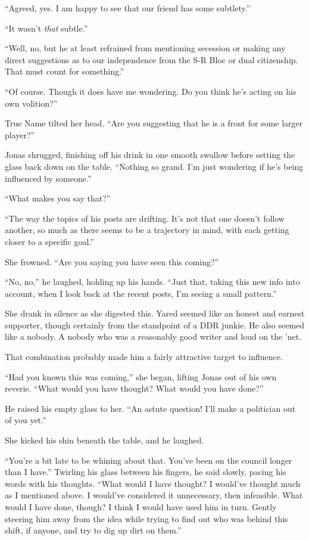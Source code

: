 ``Agreed, yes. I am happy to see that our friend has some subtlety.''

``It wasn't \emph{that} subtle.''

``Well, no, but he at least refrained from mentioning secession or making any direct suggestions as to our independence from the S-R Bloc or dual citizenship. That must count for something.''

``Of course. Though it does have me wondering. Do you think he's acting on his own volition?''

True Name tilted her head. ``Are you suggesting that he is a front for some larger player?''

Jonas shrugged, finishing off his drink in one smooth swallow before setting the glass back down on the table. ``Nothing so grand. I'm just wondering if he's being influenced by someone.''

``What makes you say that?''

``The way the topics of his posts are drifting. It's not that one doesn't follow another, so much as there seems to be a trajectory in mind, with each getting closer to a specific goal.''

She frowned. ``Are you saying you have seen this coming?''

``No, no,'' he laughed, holding up his hands. ``Just that, taking this new info into account, when I look back at the recent posts, I'm seeing a small pattern.''

She drank in silence as she digested this. Yared seemed like an honest and earnest supporter, though certainly from the standpoint of a DDR junkie. He also seemed like a nobody. A nobody who was a reasonably good writer and loud on the 'net.

That combination probably made him a fairly attractive target to influence.

``Had you known this was coming,'' she began, lifting Jonas out of his own reverie. ``What would you have thought? What would you have done?''

He raised his empty glass to her. ``An astute question! I'll make a politician out of you yet.''

She kicked his shin beneath the table, and he laughed.

``You're a bit late to be whining about that. You've been on the council longer than I have.'' Twirling his glass between his fingers, he said slowly, pacing his words with his thoughts. ``What would I have thought? I would've thought much as I mentioned above. I would've considered it unnecessary, then infeasible. What would I have done, though? I think I would have used him in turn. Gently steering him away from the idea while trying to find out who was behind this shift, if anyone, and try to dig up dirt on them.''

